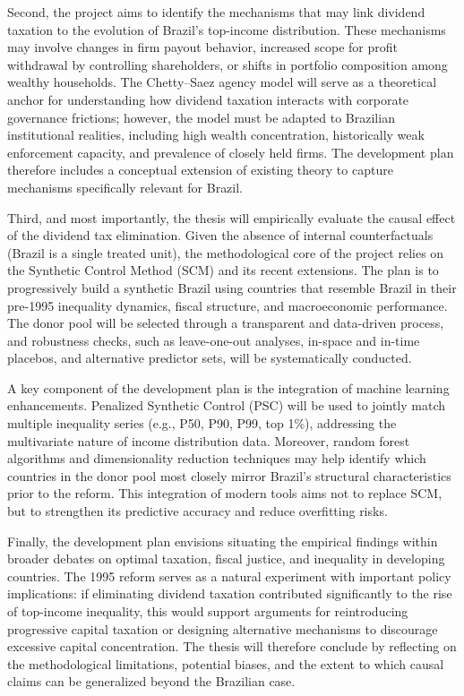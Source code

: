 \documentclass[11pt,a4paper]{article}
\begin{document}
\par
Second, the project aims to identify the mechanisms that may link dividend taxation to the evolution of Brazil’s top-income distribution. 
These mechanisms may involve changes in firm payout behavior, increased scope for profit withdrawal by controlling shareholders, or shifts in portfolio composition among wealthy households.
 The Chetty–Saez agency model will serve as a theoretical anchor for understanding how dividend taxation interacts with corporate governance frictions; however, the model must be adapted to Brazilian institutional realities, including high wealth concentration, historically weak enforcement capacity, and prevalence of closely held firms. 
 The development plan therefore includes a conceptual extension of existing theory to capture mechanisms specifically relevant for Brazil.
\par
Third, and most importantly, the thesis will empirically evaluate the causal effect of the dividend tax elimination. 
Given the absence of internal counterfactuals (Brazil is a single treated unit), the methodological core of the project relies on the Synthetic Control Method (SCM) and its recent extensions. 
The plan is to progressively build a synthetic Brazil using countries that resemble Brazil in their pre-1995 inequality dynamics, fiscal structure, and macroeconomic performance. 
The donor pool will be selected through a transparent and data-driven process, and robustness checks, such as leave-one-out analyses, in-space and in-time placebos, and alternative predictor sets, will be systematically conducted. 
\par
A key component of the development plan is the integration of machine learning enhancements. 
Penalized Synthetic Control (PSC) will be used to jointly match multiple inequality series (e.g., P50, P90, P99, top 1\%), addressing the multivariate nature of income distribution data. 
Moreover, random forest algorithms and dimensionality reduction techniques may help identify which countries in the donor pool most closely mirror Brazil’s structural characteristics prior to the reform. 
This integration of modern tools aims not to replace SCM, but to strengthen its predictive accuracy and reduce overfitting risks.
\par
Finally, the development plan envisions situating the empirical findings within broader debates on optimal taxation, fiscal justice, and inequality in developing countries. 
The 1995 reform serves as a natural experiment with important policy implications: if eliminating dividend taxation contributed significantly to the rise of top-income inequality, this would support arguments for reintroducing progressive capital taxation or designing alternative mechanisms to discourage excessive capital concentration. 
The thesis will therefore conclude by reflecting on the methodological limitations, potential biases, and the extent to which causal claims can be generalized beyond the Brazilian case.
\end{document}
